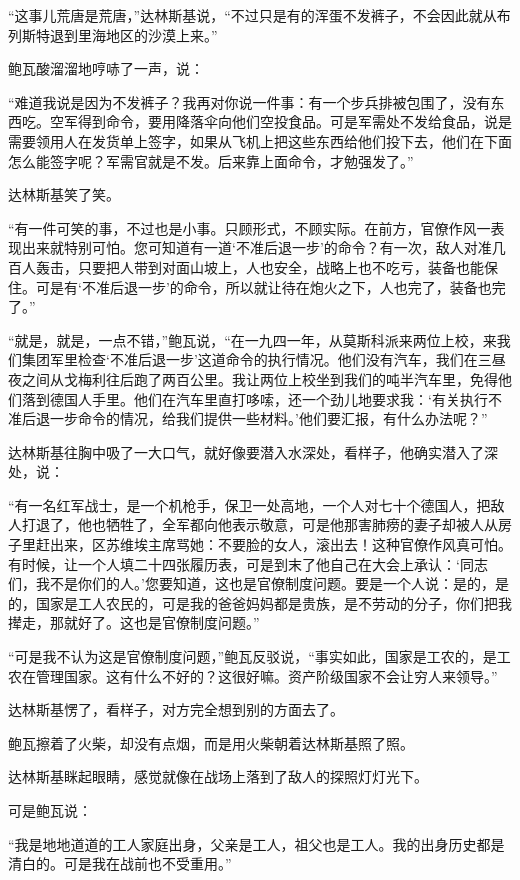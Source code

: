 “这事儿荒唐是荒唐，”达林斯基说，“不过只是有的浑蛋不发裤子，不会因此就从布列斯特退到里海地区的沙漠上来。”

鲍瓦酸溜溜地哼哧了一声，说：

“难道我说是因为不发裤子？我再对你说一件事：有一个步兵排被包围了，没有东西吃。空军得到命令，要用降落伞向他们空投食品。可是军需处不发给食品，说是需要领用人在发货单上签字，如果从飞机上把这些东西给他们投下去，他们在下面怎么能签字呢？军需官就是不发。后来靠上面命令，才勉强发了。”

达林斯基笑了笑。

“有一件可笑的事，不过也是小事。只顾形式，不顾实际。在前方，官僚作风一表现出来就特别可怕。您可知道有一道‘不准后退一步’的命令？有一次，敌人对准几百人轰击，只要把人带到对面山坡上，人也安全，战略上也不吃亏，装备也能保住。可是有‘不准后退一步’的命令，所以就让待在炮火之下，人也完了，装备也完了。”

“就是，就是，一点不错，”鲍瓦说，“在一九四一年，从莫斯科派来两位上校，来我们集团军里检查‘不准后退一步’这道命令的执行情况。他们没有汽车，我们在三昼夜之间从戈梅利往后跑了两百公里。我让两位上校坐到我们的吨半汽车里，免得他们落到德国人手里。他们在汽车里直打哆嗦，还一个劲儿地要求我：‘有关执行不准后退一步命令的情况，给我们提供一些材料。’他们要汇报，有什么办法呢？”

达林斯基往胸中吸了一大口气，就好像要潜入水深处，看样子，他确实潜入了深处，说：

“有一名红军战士，是一个机枪手，保卫一处高地，一个人对七十个德国人，把敌人打退了，他也牺牲了，全军都向他表示敬意，可是他那害肺痨的妻子却被人从房子里赶出来，区苏维埃主席骂她：不要脸的女人，滚出去！这种官僚作风真可怕。有时候，让一个人填二十四张履历表，可是到末了他自己在大会上承认：‘同志们，我不是你们的人。’您要知道，这也是官僚制度问题。要是一个人说：是的，是的，国家是工人农民的，可是我的爸爸妈妈都是贵族，是不劳动的分子，你们把我撵走，那就好了。这也是官僚制度问题。”

“可是我不认为这是官僚制度问题，”鲍瓦反驳说，“事实如此，国家是工农的，是工农在管理国家。这有什么不好的？这很好嘛。资产阶级国家不会让穷人来领导。”

达林斯基愣了，看样子，对方完全想到别的方面去了。

鲍瓦擦着了火柴，却没有点烟，而是用火柴朝着达林斯基照了照。

达林斯基眯起眼睛，感觉就像在战场上落到了敌人的探照灯灯光下。

可是鲍瓦说：

“我是地地道道的工人家庭出身，父亲是工人，祖父也是工人。我的出身历史都是清白的。可是我在战前也不受重用。”

